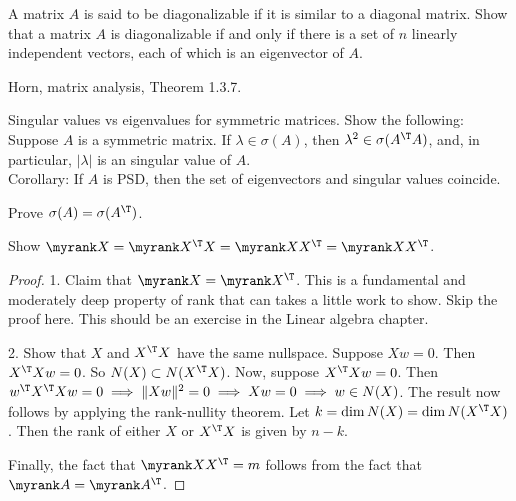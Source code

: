 \begin{exercise}
A matrix $A$ is said to be diagonalizable if it is similar to a diagonal matrix. Show that a matrix $A$ is diagonalizable if and only if there is a set of $n$ linearly independent vectors, each of which is an eigenvector of $A$. 
\end{exercise}

\begin{solution}
Horn, matrix analysis, Theorem 1.3.7. 
\end{solution}

\begin{exercise}
Singular values vs eigenvalues for symmetric matrices. Show the following: Suppose $A$ is a symmetric matrix. If $\lambda \in \sigma(A)$, then $\lambda^2 \in \sigma(A^\T A)$, and, in particular, $|\lambda |$ is an singular value of $A$. \\

Corollary: If $A$ is PSD, then the set of eigenvectors and singular values coincide. 
\end{exercise}

\begin{solution}
\end{solution}

%
\begin{exercise}
Prove $\sigma(A) = \sigma(A^\T)$.
\end{exercise}

\begin{solution}
\end{solution}

% 
\begin{exercise} \label{exer:rank-eqs}
Show $\myrank X = \myrank X^\T X = \myrank X X^\T = \myrank X X^\T$. 
\end{exercise}

\begin{solution}
\begin{proof}
1. Claim that $\myrank X = \myrank X^\T$. This is a fundamental and moderately deep property of rank that can takes a little work to show. Skip the proof here. This should be an exercise in the Linear algebra chapter. 

2. Show that $X$ and $X^\T X$ have the same nullspace. Suppose $Xw = 0$. Then $X^\T Xw = 0$. So $N(X) \subset N(X^\T X)$. Now, suppose $X^\T X w = 0$. Then $w^\T X^\T X w = 0 \implies \|Xw\|^2 = 0 \implies Xw = 0 \implies w \in N(X)$. The result now follows by applying the rank-nullity theorem. Let $k = \dim N(X) = \dim N(X^\T X)$. Then the rank of either $X$ or $X^\T X$ is given by $n-k$.

Finally, the fact that $\myrank XX^\T = m$ follows from the fact that $\myrank A = \myrank A^\T$. 
\end{proof}
\end{solution}

